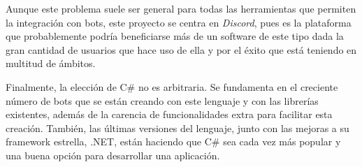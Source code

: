 Aunque este problema suele ser general para todas las herramientas que permiten la integración con bots, este proyecto se centra en \textit{Discord}, pues es la plataforma que probablemente podría beneficiarse más de un software de este tipo dada la gran cantidad de usuarios que hace uso de ella y por el éxito\cite{enlyft} que está teniendo en multitud de ámbitos.

Finalmente, la elección de C\# no es arbitraria. Se fundamenta en el creciente número de bots que se están creando con este lenguaje y con las librerías existentes, además de la carencia de funcionalidades extra para facilitar esta creación. También, las últimas versiones del lenguaje, junto con las mejoras a su framework estrella, .NET, están haciendo que C\# sea cada vez más popular y una buena opción para desarrollar una aplicación.